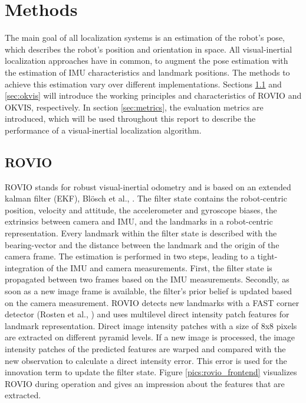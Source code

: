 \chapter{Methods}
\label{sec:methods}

The main goal of all localization systems is an estimation of the robot's pose, which describes the robot's position and orientation in space. All visual-inertial localization approaches have in common, to augment the pose estimation with the estimation of IMU characteristics and landmark positions. The methods to achieve this estimation vary over different implementations. Sections \ref{sec:rovio} and \ref{sec:okvis} will introduce the working principles and characteristics of ROVIO and OKVIS, respectively. In section \ref{sec:metrics}, the evaluation metrics are introduced, which will be used throughout this report to describe the performance of a visual-inertial localization algorithm.

\section{ROVIO}
\label{sec:rovio}

ROVIO stands for robust visual-inertial odometry and is based on an extended kalman filter (EKF), Blösch et al., \cite{bloeschrobust}. The filter state contains the robot-centric position, velocity and attitude, the accelerometer and gyroscope biases, the extrinsics between camera and IMU, and the landmarks in a robot-centric representation. Every landmark within the filter state is described with the bearing-vector and the distance between the landmark and the origin of the camera frame. The estimation is performed in two steps, leading to a tight-integration of the IMU and camera measurements. First, the filter state is propagated between two frames based on the IMU measurements. Secondly, as soon as a new image frame is available, the filter's prior belief is updated based on the camera measurement. ROVIO detects new landmarks with a FAST corner detector (Rosten et al., \cite{rosten2006machine}) and uses multilevel direct intensity patch features for landmark representation. Direct image intensity patches with a size of 8x8 pixels are extracted on different pyramid levels. If a new image is processed, the image intensity patches of the predicted features are warped and compared with the new observation to calculate a direct intensity error. This error is used for the innovation term to update the filter state. Figure \ref{pics:rovio_frontend} visualizes ROVIO during operation and gives an impression about the features that are extracted. \\

